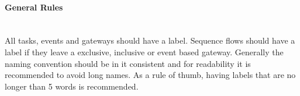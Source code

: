 \paragraph{General Rules}~\\
All tasks, events and gateways should have a label. Sequence flows should have a label if they leave a exclusive, inclusive or event based gateway. Generally the naming convention should be in it consistent and for readability it is recommended to avoid long names. As a rule of thumb, having labels that are no longer than 5 words is recommended\cite{fundamentals}. 